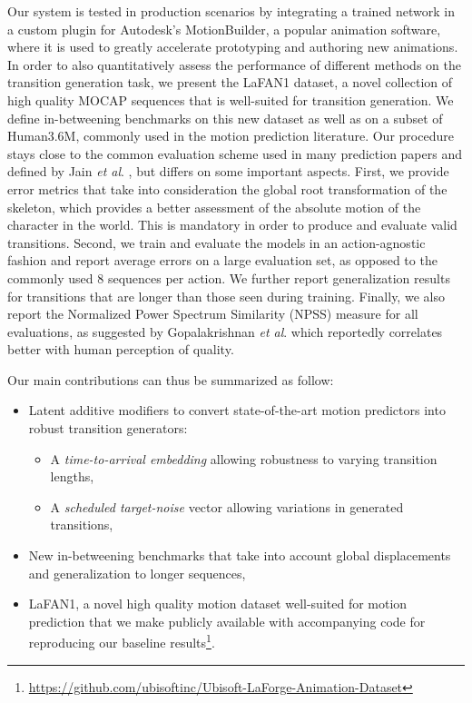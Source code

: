 \documentclass[acmtog]{acmart}
\newcommand{\etal}{\textit{et al}. }
\begin{document}
Our system is tested in production scenarios by integrating a trained network in a custom plugin for Autodesk's MotionBuilder, a popular animation software, where it is used to greatly accelerate prototyping and authoring new animations.
In order to also quantitatively assess the performance of different methods on the transition generation task, we present the LaFAN1 dataset, a novel collection of high quality MOCAP sequences that is well-suited for transition generation. We define in-betweening benchmarks on this new dataset as well as on a subset of Human3.6M, commonly used in the motion prediction literature. Our procedure stays close to the common evaluation scheme used in many prediction papers and defined by Jain \etal {}, but differs on some important aspects. First, we provide error metrics that take into consideration the global root transformation of the skeleton, which provides a better assessment of the absolute motion of the character in the world. This is mandatory in order to produce and evaluate valid transitions. Second, we train and evaluate the models in an action-agnostic fashion and report average errors on a large evaluation set, as opposed to the commonly used 8 sequences per action. We further report generalization results for transitions that are longer than those seen during training. Finally, we also report the Normalized Power Spectrum Similarity (NPSS) measure for all evaluations, as suggested by Gopalakrishnan \etal {} which reportedly correlates better with human perception of quality.

Our main contributions can thus be summarized as follow:
\begin{itemize}
    \item Latent additive modifiers to convert state-of-the-art motion predictors into robust transition generators:
    \begin{itemize}
        \item A \textit{time-to-arrival embedding} allowing robustness to varying transition lengths,
        \item A \textit{scheduled target-noise} vector allowing variations in generated transitions,
    \end{itemize}
    \item New in-betweening benchmarks that take into account global displacements and generalization to longer sequences,
    \item LaFAN1, a novel high quality motion dataset well-suited for motion prediction that we make publicly available with accompanying code for reproducing our baseline results\footnote{\href{https://github.com/ubisoftinc/Ubisoft-LaForge-Animation-Dataset}{https://github.com/ubisoftinc/Ubisoft-LaForge-Animation-Dataset}}.
\end{itemize}
\end{document}

